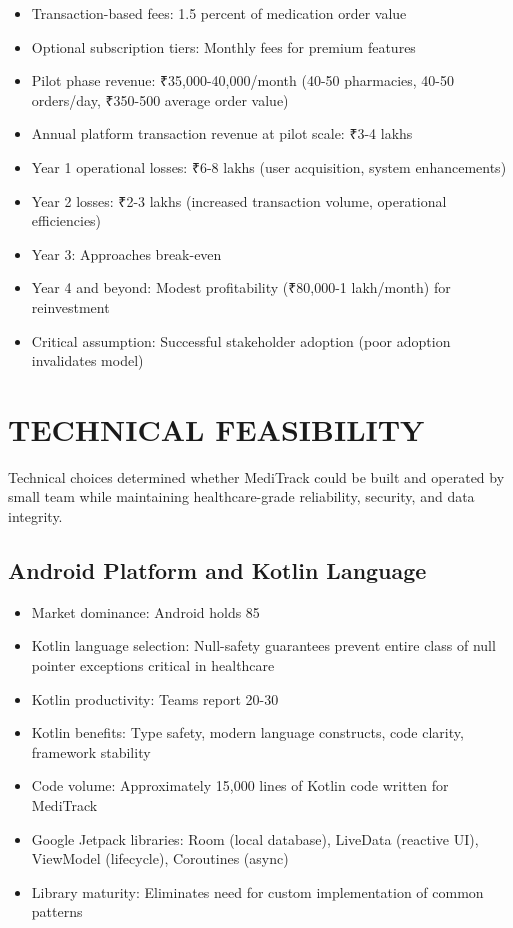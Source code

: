 \documentclass[12pt,a4paper]{report}
\begin{document}
\begin{itemize}
  \item Transaction-based fees: 1.5 percent of medication order value
  \item Optional subscription tiers: Monthly fees for premium features
  \item Pilot phase revenue: ₹35,000-40,000/month (40-50 pharmacies, 40-50 orders/day, ₹350-500 average order value)
  \item Annual platform transaction revenue at pilot scale: ₹3-4 lakhs
  \item Year 1 operational losses: ₹6-8 lakhs (user acquisition, system enhancements)
  \item Year 2 losses: ₹2-3 lakhs (increased transaction volume, operational efficiencies)
  \item Year 3: Approaches break-even
  \item Year 4 and beyond: Modest profitability (₹80,000-1 lakh/month) for reinvestment
  \item Critical assumption: Successful stakeholder adoption (poor adoption invalidates model)
\end{itemize}

\section{TECHNICAL FEASIBILITY}

Technical choices determined whether MediTrack could be built and operated by small team while maintaining healthcare-grade reliability, security, and data integrity.

\subsection{Android Platform and Kotlin Language}

\begin{itemize}
  \item Market dominance: Android holds 85%
  \item Kotlin language selection: Null-safety guarantees prevent entire class of null pointer exceptions critical in healthcare
  \item Kotlin productivity: Teams report 20-30%
  \item Kotlin benefits: Type safety, modern language constructs, code clarity, framework stability
  \item Code volume: Approximately 15,000 lines of Kotlin code written for MediTrack
  \item Google Jetpack libraries: Room (local database), LiveData (reactive UI), ViewModel (lifecycle), Coroutines (async)
  \item Library maturity: Eliminates need for custom implementation of common patterns
\end{itemize}
\end{document}
